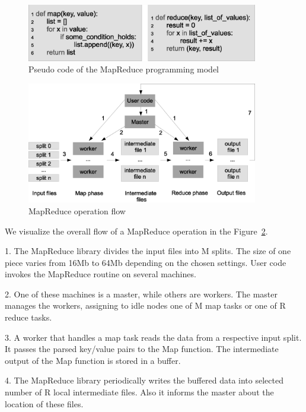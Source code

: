 \begin{figure}
  \centering
  \includegraphics [width=0.9\textwidth]{images/MapReduce_pseudo_code}
  \caption{Pseudo code of the MapReduce programming model}
  \label{fig:mapreduce_pseudo_code}
\end{figure}

\begin{figure}
  \centering
  \includegraphics [width=0.9\textwidth]{images/MapReduce_operation_flow}
  \caption{MapReduce operation flow}
  \label{fig:mapreduce_operation_flow}
\end{figure}

We visualize the overall flow of a MapReduce operation in the Figure~\ref{fig:mapreduce_operation_flow}.

1. The MapReduce library divides the input files into M splits.
The size of one piece varies from 16Mb to 64Mb depending on the chosen settings.
User code invokes the MapReduce routine on several machines.

2. One of these machines is a master, while others are workers.
The master manages the workers, assigning to idle nodes one of M map tasks or one of R reduce tasks.

3. A worker that handles a map task reads the data from a respective input split.
It passes the parsed key/value pairs to the Map function.
The intermediate output of the Map function is stored in a buffer.

4. The MapReduce library periodically writes the buffered data into selected number of R local intermediate files.
Also it informs the master about the location of these files.

